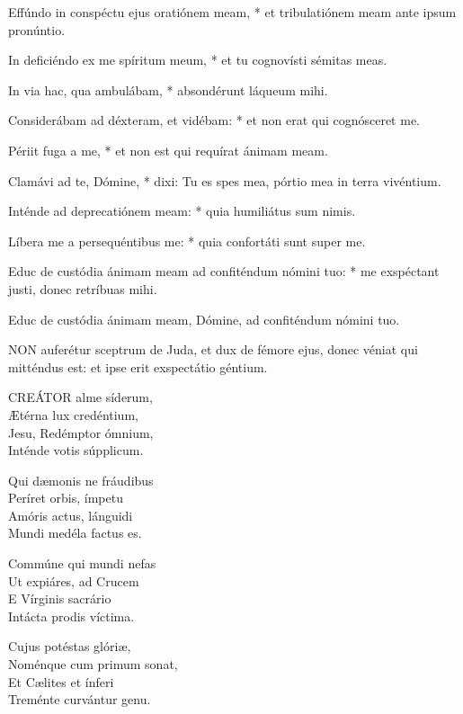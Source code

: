 Effúndo in conspéctu ejus oratiónem meam, * et tribulatiónem meam ante ipsum pronúntio.

In deficiéndo ex me spíritum meum, * et tu cognovísti sémitas meas.

In via hac, qua ambulábam, * absondérunt láqueum mihi.

Considerábam ad déxteram, et vidébam: * et non erat qui cognósceret me.

Périit fuga a me, * et non est qui requírat ánimam meam.

Clamávi ad te, Dómine, * dixi: Tu es spes mea, pórtio mea in terra vivéntium.

Inténde ad deprecatiónem meam: * quia humiliátus sum nimis.

Líbera me a persequéntibus me: * quia confortáti sunt super me.

Educ de custódia ánimam meam ad confiténdum nómini tuo: * me exspéctant justi, donec retríbuas mihi.

 Educ de custódia ánimam meam, Dómine, ad confiténdum nómini tuo.



\lettrine[lines=2]{N}{ON} auferétur sceptrum de Juda, et dux de fémore ejus, donec véniat qui mitténdus est: et ipse erit exspectátio géntium.


\lettrine[lines=2]{C}{REÁTOR} alme síderum,\\
Ætérna lux credéntium,\\
Jesu, Redémptor ómnium,\\
Inténde votis súpplicum.

Qui dæmonis ne fráudibus\\
Períret orbis, ímpetu\\
Amóris actus, lánguidi\\
Mundi medéla factus es.

Commúne qui mundi nefas\\
Ut expiáres, ad Crucem\\
E Vírginis sacrário\\
Intácta prodis víctima.

Cujus potéstas glóriæ,\\
Noménque cum primum sonat,\\
Et Cælites et ínferi\\
Treménte curvántur genu.

